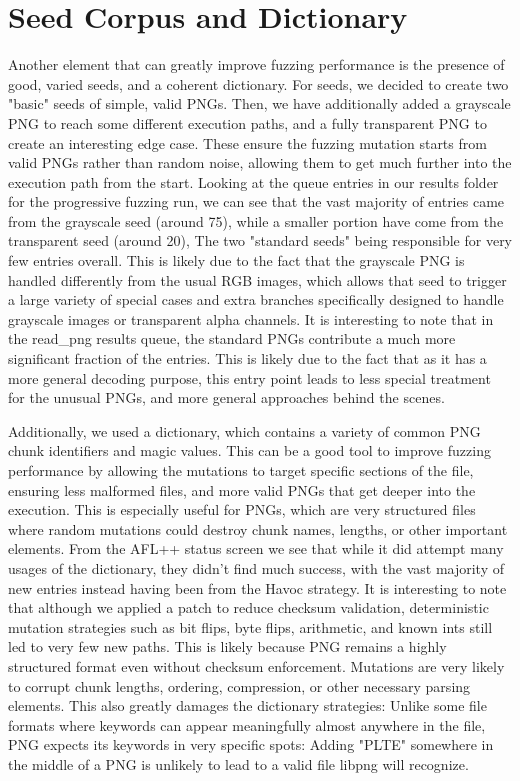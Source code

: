\documentclass[letterpaper,twocolumn,10pt]{article}
\begin{document}

\section{Seed Corpus and Dictionary}
Another element that can greatly improve fuzzing performance is the presence of good, varied seeds, and a coherent dictionary. For seeds, we decided to create two "basic" seeds of simple, valid PNGs. Then, we have additionally added a grayscale PNG to reach some different execution paths, and a fully transparent PNG to create an interesting edge case. These ensure the fuzzing mutation starts from valid PNGs rather than random noise, allowing them to get much further into the execution path from the start. Looking at the queue entries in our results folder for the progressive fuzzing run, we can see that the vast majority of entries came from the grayscale seed (around 75), while a smaller portion have come from the transparent seed (around 20), The two "standard seeds" being responsible for very few entries overall. This is likely due to the fact that the grayscale PNG is handled differently from the usual RGB images, which allows that seed to trigger a large variety of special cases and extra branches specifically designed to handle grayscale images or transparent alpha channels. It is interesting to note that in the read\_png results queue, the standard PNGs contribute a much more significant fraction of the entries. This is likely due to the fact that as it has a more general decoding purpose, this entry point leads to less special treatment for the unusual PNGs, and more general approaches behind the scenes.

Additionally, we used a dictionary, which contains a variety of common PNG chunk identifiers and magic values. This can be a good tool to improve fuzzing performance by allowing the mutations to target specific sections of the file, ensuring less malformed files, and more valid PNGs that get deeper into the execution. This is especially useful for PNGs, which are very structured files where random mutations could destroy chunk names, lengths, or other important elements. From the AFL++ status screen we see that while it did attempt many usages of the dictionary, they didn't find much success, with the vast majority of new entries instead having been from the Havoc strategy. It is interesting to note that although we applied a patch to reduce checksum validation, deterministic mutation strategies such as bit flips, byte flips, arithmetic, and known ints still led to very few new paths. This is likely because PNG remains a highly structured format even without checksum enforcement. Mutations are very likely to corrupt chunk lengths, ordering, compression, or other necessary parsing elements. This also greatly damages the dictionary strategies: Unlike some file formats where keywords can appear meaningfully almost anywhere in the file, PNG expects its keywords in very specific spots: Adding "PLTE" somewhere in the middle of a PNG is unlikely to lead to a valid file libpng will recognize.
\end{document}
